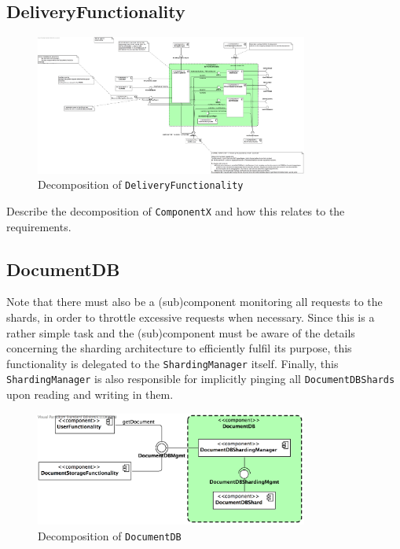 \documentclass[a4paper,10pt]{article}
\begin{document}
\subsection{DeliveryFunctionality}\label{subsec:decomp-DeliveryFunctionality}
\begin{figure}[!htp]
	\centering
	\includegraphics[width=0.8\textwidth]{DeliveryFunctionality.png}
	\caption{Decomposition of \texttt{DeliveryFunctionality}}
	\label{fig:decomp-DeliveryFunctionality}
\end{figure}
\FloatBarrier

Describe the decomposition of \texttt{ComponentX} and how this relates to the
requirements.

\subsection{DocumentDB}\label{subsec:decomp-DocumentDB}
Note that there must also be a (sub)component monitoring all requests to the shards, in order to throttle excessive requests when necessary. Since this is a rather simple task and the (sub)component must be aware of the details concerning the sharding architecture to efficiently fulfil its purpose, this functionality is delegated to the \texttt{ShardingManager} itself. Finally, this \texttt{ShardingManager} is also responsible for implicitly pinging all \texttt{DocumentDBShards} upon reading and writing in them.
\begin{figure}[!htp]
	\centering
	\includegraphics[width=0.8\textwidth]{DocumentDB.png}
	\caption{Decomposition of \texttt{DocumentDB}}
	\label{fig:decomp-DocumentDB}
\end{figure}
\FloatBarrier
\end{document}
